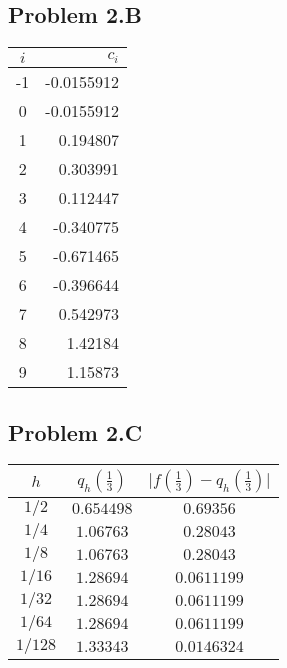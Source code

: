 \documentclass[a4paper,12pt,onecolumn,final]{article}
\begin{document}
\subsection*{Problem 2.B}
\begin{center}
\begin{tabular}{cr}
\hline\hline
 $i$ & $c_i$
\\
\hline
-1 & -0.0155912
\\
0 & -0.0155912
\\
1 & 0.194807
\\
2 & 0.303991
\\
3 & 0.112447
\\
4 & -0.340775
\\
5 & -0.671465
\\
6 & -0.396644
\\
7 & 0.542973
\\
8 & 1.42184
\\
9 & 1.15873
\\
\hline\hline
\end{tabular}
\end{center}
\subsection*{Problem 2.C}
\begin{center}
\begin{tabular}{c|cc}
 $h$ & $q_h(\frac{1}{3})$ & $\big|f(\frac{1}{3}) - q_h(\frac{1}{3})\big|$
\\[0.5ex]
\hline
$1/2$ & $0.654498$	& $0.69356$ 
\\
$1/4$ & $1.06763$	& $0.28043$
\\
$1/8$ & $1.06763$	& $0.28043$
\\
$1/16$ & $1.28694$	& $0.0611199$
\\
$1/32$ &  $1.28694$	& $0.0611199$
\\
$1/64$ & $1.28694$	& $0.0611199$
\\
$1/128$ & $1.33343$	& $0.0146324$

\\
\end{tabular}
\end{center}
\end{document}
